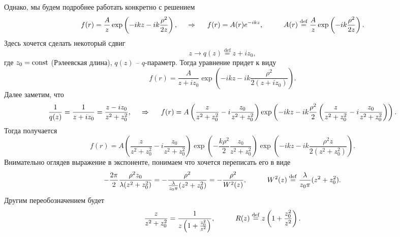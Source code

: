 Однако, мы будем подробнее работать конкретно с решением 
\begin{equation*}
    f(r) = \frac{A}{z} \exp\left(-i k z - ik \frac{\rho^2}{2z}\right),
    \hspace{0.5cm} \Rightarrow \hspace{0.5cm}
    f(r) = A(r) e^{-ikz},
    \hspace{1 cm}
    A(r) \overset{\mathrm{def}}{=}  \frac{A}{z} \exp\left(-i k \frac{\rho^2}{2z}\right).
\end{equation*}
Здесь хочется сделать некоторый сдвиг
\begin{equation*}
    z \longrightarrow q(z) \overset{\mathrm{def}}{=}  z + i z_0,
\end{equation*}
где $z_0 = \text{const}$ (Рэлеевская длина), $q(z)$ -- $q$-параметр. Тогда уравнение придет к виду
\begin{equation*}
    f(r) = \frac{A}{z + i z_0} \exp\left(
        -i k z - i k \frac{\rho^2}{2 (z+i z_0)}
    \right).
\end{equation*}
Далее заметим, что
\begin{equation*}
    \frac{1}{q(z)} = \frac{1}{z + i z_0} = \frac{z- iz_0}{z^2 + z_0^2},
    \hspace{0.5cm} \Rightarrow \hspace{0.5cm}
    f(r) = A\left(
        \frac{z}{z^2+z_0^2} - i \frac{z_0}{z^2 + z_0^2}
    \right) \exp\left(
        -i k z- ik \frac{\rho^2}{2} \left(
            \frac{z}{z^2+z_0^2} - i \frac{z_0}{z^2+z_0^2}
        \right)
    \right).
\end{equation*}
Тогда получается
\begin{equation*}
    f(r) = A \left(
        \frac{z}{z^2+z_0^2} - i \frac{z_0}{z^2+z_0^2}
    \right) \exp\left(
        - \frac{k \rho^2}{2} \frac{z_0}{z^2+z_0^2}
    \right) \exp\left(
        - ikz - ik \frac{\rho^2 z}{2(z^2 + z_0^2)}
    \right).
\end{equation*}
Внимательно оглядев выражение в экспоненте, понимаем что хочется переписать его в виде
\begin{equation}
    - \frac{2 \pi}{2} \frac{\rho^2 z_0}{\lambda (z^2+z_0^2)} = - \frac{\rho^2}{\frac{\lambda}{z_0 \pi}(z^2+z_0^2)} = 
    - \frac{\rho^2}{W^2(z)},
    \hspace{1 cm}
    W^2(z) \overset{\mathrm{def}}{=} \frac{\lambda}{z_0 \pi}(z^2+z_0^2).
\end{equation}
Другим переобозначением будет
\begin{equation}
    \frac{z}{z^2+z_0^2} = \frac{1}{z\left(
        1 + \frac{z_0^2}{z^2}
    \right)},
    \hspace{1 cm}
    R(z) \overset{\mathrm{def}}{=}  z \left(1 + \frac{z_0^2}{z^2}\right).
\end{equation}
